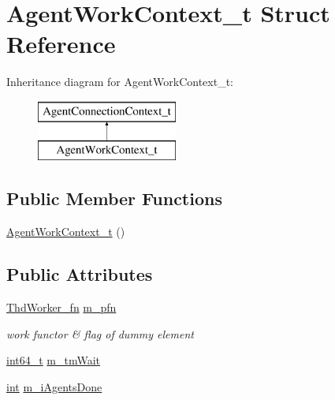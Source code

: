 \hypertarget{structAgentWorkContext__t}{\section{Agent\-Work\-Context\-\_\-t Struct Reference}
\label{structAgentWorkContext__t}
}
Inheritance diagram for Agent\-Work\-Context\-\_\-t\-:\begin{figure}[H]
\begin{center}
\leavevmode
\includegraphics[height=2.000000cm]{structAgentWorkContext__t}
\end{center}
\end{figure}
\subsection*{Public Member Functions}
\begin{DoxyCompactItemize}
\item 
\hyperlink{structAgentWorkContext__t_a79af811895ace3949ecaaebaaed32748}{Agent\-Work\-Context\-\_\-t} ()
\end{DoxyCompactItemize}
\subsection*{Public Attributes}
\begin{DoxyCompactItemize}
\item 
\hyperlink{searchdha_8cpp_ae3f0466fd37fe9e573a13b81ff22c421}{Thd\-Worker\-\_\-fn} \hyperlink{structAgentWorkContext__t_a9cd1003daea3a6de7b7868263ce4e465}{m\-\_\-pfn}
\begin{DoxyCompactList}\small\item\em work functor \& flag of dummy element \end{DoxyCompactList}\item 
\hyperlink{sphinxstd_8h_a996e72f71b11a5bb8b3b7b6936b1516d}{int64\-\_\-t} \hyperlink{structAgentWorkContext__t_aae16338158e38e9594f211271fddc90c}{m\-\_\-tm\-Wait}
\item 
\hyperlink{sphinxexpr_8cpp_a4a26e8f9cb8b736e0c4cbf4d16de985e}{int} \hyperlink{structAgentWorkContext__t_a65d33a3063ff0ce75c2f88e7825f5afb}{m\-\_\-i\-Agents\-Done}
\end{DoxyCompactItemize}


